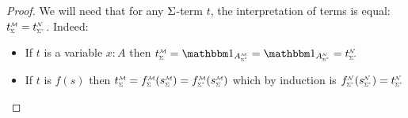 \begin{proof}
    We will need that for any $\Sigma$-term $t$,
    the interpretation of terms is equal:
    $\subintp{\Si}{\MM}{t} = \subintp{\Si^*}{\NN}{t}$.
    Indeed:
    \begin{itemize}
        \item If $t$ is a variable $x : A$ then 
        $\subintp{\Si}{\MM}{t} = \id{\subintp{\Si^*}{\MM}{A}} =
        \id{\subintp{\Si^*}{\NN}{A}} = \subintp{\Si^*}{\NN}{t}$
        \item If $t$ is $f(s)$ then 
        $\subintp{\Si}{\MM}{t} = \subintp{\Si}{\MM}{f}(\subintp{\Si}{\MM}{s}) =
        \subintp{\Si^*}{\MM}{f}(\subintp{\Si}{\MM}{s})$ which by induction is
        $\subintp{\Si^*}{\NN}{f}(\subintp{\Si^*}{\NN}{s}) = 
        \subintp{\Si^*}{\NN}{t}$
    \end{itemize}
    

\end{proof}
